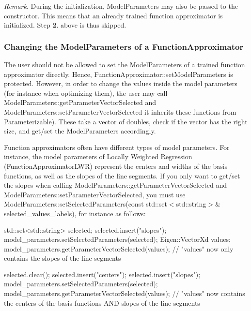 {\itshape Remark}. During the initialization, Model\+Parameters may also be passed to the constructor. This means that an already trained function approximator is initialized. Step {\bfseries 2}. above is thus skipped.\hypertarget{page_func_approx_sec_fa_changing_modelparameters}{}\subsubsection{Changing the Model\+Parameters of a Function\+Approximator}\label{page_func_approx_sec_fa_changing_modelparameters}
The user should not be allowed to set the Model\+Parameters of a trained function approximator directly. Hence, Function\+Approximator\+::set\+Model\+Parameters is protected. However, in order to change the values inside the model parameters (for instance when optimizing them), the user may call Model\+Parameters\+::get\+Parameter\+Vector\+Selected and Model\+Parameters\+::set\+Parameter\+Vector\+Selected it inherits these functions from Parameterizable). These take a vector of doubles, check if the vector has the right size, and get/set the Model\+Parameters accordingly.

Function approximators often have different types of model parameters. For instance, the model parameters of Locally Weighted Regression (Function\+Approximator\+L\+W\+R) represent the centers and widths of the basis functions, as well as the slopes of the line segments. If you only want to get/set the slopes when calling Model\+Parameters\+::get\+Parameter\+Vector\+Selected and Model\+Parameters\+::set\+Parameter\+Vector\+Selected, you must use Model\+Parameters\+::set\+Selected\+Parameters(const std\+::set$<$std\+::string$>$\& selected\+\_\+values\+\_\+labels), for instance as follows\+:


\begin{DoxyCode}
std::set<std::string> selected;
selected.insert(\textcolor{stringliteral}{"slopes"});
model\_parameters.setSelectedParameters(selected);
Eigen::VectorXd values;
model\_parameters.getParameterVectorSelected(values);
\textcolor{comment}{// "values" now only contains the slopes of the line segments}

selected.clear();
selected.insert(\textcolor{stringliteral}{"centers"});
selected.insert(\textcolor{stringliteral}{"slopes"});
model\_parameters.setSelectedParameters(selected);
model\_parameters.getParameterVectorSelected(values);
\textcolor{comment}{// "values" now contains the centers of the basis functions AND slopes of the line segments}
\end{DoxyCode}



